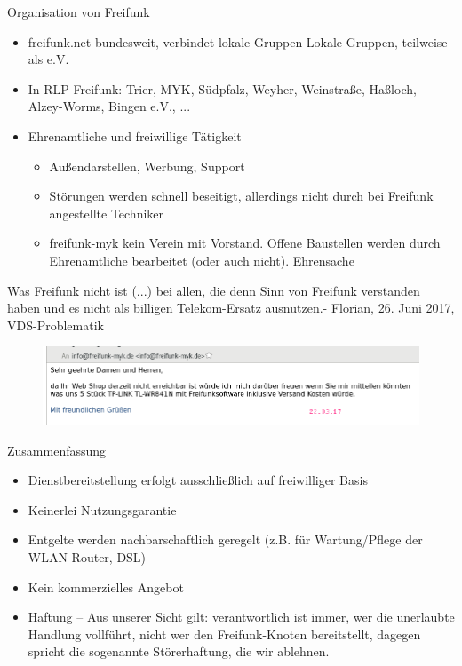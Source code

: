 \documentclass{beamer}
\begin{document}
\begin{frame} {Organisation von Freifunk}
\begin{itemize}
\item freifunk.net bundesweit, verbindet lokale Gruppen
Lokale Gruppen, teilweise als e.V.
\item In RLP Freifunk: Trier, MYK, Südpfalz, Weyher, Weinstraße, Haßloch, Alzey-Worms, Bingen e.V., ...
\item Ehrenamtliche und freiwillige Tätigkeit
\begin{itemize}
\item Außendarstellen, Werbung, Support
\item Störungen werden schnell beseitigt, allerdings nicht durch bei Freifunk angestellte Techniker
\item freifunk-myk kein Verein mit Vorstand. Offene Baustellen werden durch Ehrenamtliche bearbeitet (oder auch nicht). Ehrensache
\end{itemize}
\end{itemize}
\end{frame}

\begin{frame}{Was Freifunk nicht ist}
\glqq (...) bei allen, die denn Sinn von Freifunk verstanden haben und es nicht als billigen Telekom-Ersatz ausnutzen.\grqq - Florian, 26. Juni 2017, VDS-Problematik
\begin{figure}
\centering
\includegraphics[width=1.0\linewidth]{Bilder/Webshopmail}
\label{fig:webshopmail}
\end{figure}
\end{frame}

\begin{frame} {Zusammenfassung}
\begin{itemize}
\item Dienstbereitstellung erfolgt ausschließlich auf freiwilliger Basis
\item Keinerlei Nutzungsgarantie
\item Entgelte werden nachbarschaftlich geregelt (z.B. für Wartung/Pflege der WLAN-Router, DSL)
\item Kein kommerzielles Angebot
\item Haftung – Aus unserer Sicht gilt: verantwortlich ist immer, wer die unerlaubte Handlung vollführt, nicht wer den Freifunk-Knoten bereitstellt, dagegen spricht die sogenannte Störerhaftung, die wir ablehnen.
\end{itemize}
\end{frame}
\end{document}
